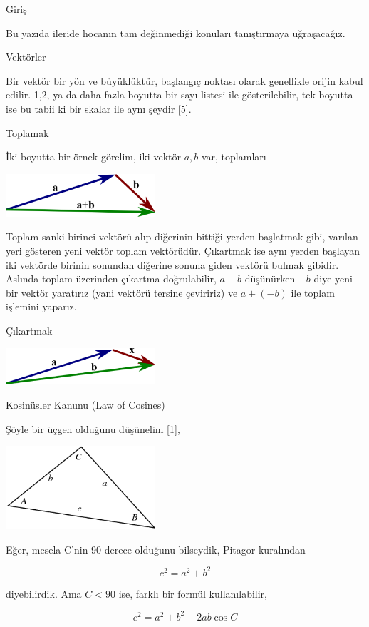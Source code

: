 \documentclass[12pt,fleqn]{article}\usepackage{../../common}
\begin{document}
Giriş

Bu yazıda ileride hocanın tam değinmediği konuları tanıştırmaya uğraşacağız.

Vektörler

Bir vektör bir yön ve büyüklüktür, başlangıç noktası olarak genellikle orijin
kabul edilir. 1,2, ya da daha fazla boyutta bir sayı listesi ile gösterilebilir,
tek boyutta ise bu tabii ki bir skalar ile aynı şeydir [5]. 

Toplamak

İki boyutta bir örnek görelim, iki vektör $a,b$ var, toplamları

\includegraphics[width=15em]{vector_a_plus_b.png}

Toplam sanki birinci vektörü alıp diğerinin bittiği yerden başlatmak gibi,
varılan yeri gösteren yeni vektör toplam vektörüdür. Çıkartmak ise aynı yerden
başlayan iki vektörde birinin sonundan diğerine sonuna giden vektörü bulmak
gibidir. Aslında toplam üzerinden çıkartma doğrulabilir, $a-b$ düşünürken $-b$
diye yeni bir vektör yaratırız (yani vektörü tersine çeviririz) ve $a+(-b)$ ile
toplam işlemini yaparız.

Çıkartmak

\includegraphics[width=15em]{vector_b_minus_a.png}

Kosinüsler Kanunu (Law of Cosines)

Şöyle bir üçgen olduğunu düşünelim [1],

\includegraphics[width=15em]{cos1.png}

Eğer, mesela C'nin 90 derece olduğunu bilseydik, Pitagor kuralından

$$
c^2 = a^2 + b^2
$$

diyebilirdik. Ama $C < 90$ ise, farklı bir formül kullanılabilir,

$$
c^2 = a^2 + b^2 - 2 a b \cos C
$$
\end{document}
